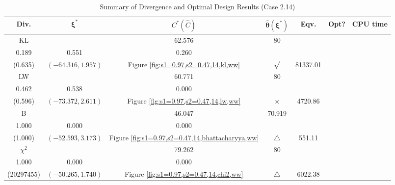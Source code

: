 \documentclass[12pt, a4paper]{article}
\begin{document}
\begin{table}[H]
\centering
\renewcommand{\arraystretch}{1.5} %
\setlength{\tabcolsep}{8pt} %
\begin{tabular}{|c|c|c|c|c|c|c|}
\hline
\textbf{Div.} & \(\boldsymbol{\xi^*}\) & \(C^* (\hat{C})\) & \(\boldsymbol{\hat{\theta}(\xi^*)}\) & \textbf{Eqv.} & \textbf{Opt?} & \textbf{CPU time} \\
\hline
KL & \(\left\{\begin{array}{ccc}
45.473 & 62.576 & 80 \\
0.189 & 0.551 & 0.260
\end{array}\right\}\) &
\(\begin{array}{c}
0.635 \\
(0.635)
\end{array}\) & 
\((-64.316, 1.957)\) & 
Figure \ref{fig:s1=0.97,s2=0.47,14,kl,ww} & $\surd$ & 81337.01 \\
\hline
LW & \(\left\{\begin{array}{ccc}
41.785 & 60.771 & 80 \\
0.462 & 0.538 & 0.000
\end{array}\right\}\) &
\(\begin{array}{c}
0.0703 \\
(0.596)
\end{array}\) & 
\((-73.372, 2.611)\) & 
Figure \ref{fig:s1=0.97,s2=0.47,14,lw,ww} & $\times$ & 4720.86 \\
\hline
B & \(\left\{\begin{array}{ccc}
10 & 46.047 & 70.919 \\
1.000 & 0.000 & 0.000
\end{array}\right\}\) &
\(\begin{array}{c}
1.000 \\
(1.000)
\end{array}\) & 
\((-52.593, 3.173)\) & 
Figure \ref{fig:s1=0.97,s2=0.47,14,bhattacharyya,ww} & $\triangle$ & 551.11 \\
\hline
\(\chi^2\) & \(\left\{\begin{array}{ccc}
71.02 & 79.262 & 80 \\
1.000 & 0.000 & 0.000
\end{array}\right\}\) &
\(\begin{array}{c}
34504337 \\
(20297455)
\end{array}\) & 
\((-50.265, 1.740)\) & 
Figure \ref{fig:s1=0.97,s2=0.47,14,chi2,ww} & $\triangle$ & 6022.38 \\
\hline
\end{tabular}
\caption{Summary of Divergence and Optimal Design Results (Case 2.14)}
\label{tab:results2.14}
\end{table}
\end{document}
